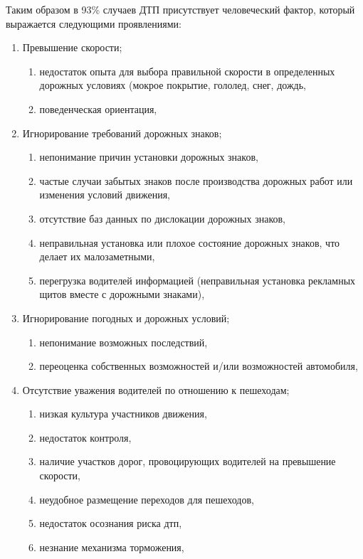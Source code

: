 Таким образом в 93\% случаев ДТП присутствует человеческий фактор, который 
выражается следующими проявлениями:
\begin{enumerate}
  \item Превышение скорости;
    \begin{enumerate}
      \item недостаток опыта для выбора правильной скорости в
            определенных дорожных условиях (мокрое покрытие,
            гололед, снег, дождь,
      \item поведенческая ориентация,
    \end{enumerate}

  \item Игнорирование требований дорожных знаков;
    \begin{enumerate}
      \item непонимание причин установки дорожных знаков,
      \item частые случаи забытых знаков после производства дорожных
            работ или изменения условий движения,
      \item отсутствие баз данных по дислокации дорожных знаков,
      \item неправильная установка или плохое состояние дорожных
            знаков, что делает их малозаметными,
      \item перегрузка водителей информацией (неправильная
            установка рекламных щитов вместе с дорожными знаками),
    \end{enumerate}

  \item Игнорирование погодных и дорожных условий;
  \begin{enumerate}
    \item непонимание возможных последствий,
    \item переоценка собственных возможностей и/или возможностей автомобиля,
  \end{enumerate}

  \item Отсутствие уважения водителей по отношению к пешеходам;
    \begin{enumerate}
      \item низкая культура участников движения,
      \item недостаток контроля,
      \item наличие участков дорог, провоцирующих водителей на
            превышение скорости,
      \item неудобное размещение переходов для пешеходов,
      \item недостаток осознания риска дтп,
      \item незнание механизма торможения,
    \end{enumerate}


\end{enumerate}
